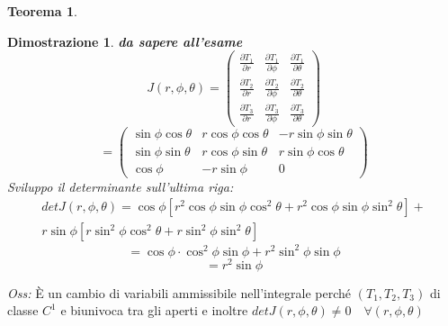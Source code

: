 \documentclass[10pt,landscape, a4paper]{article}
\newtheorem{teorema}{Teorema}
\newenvironment{thm}{\begin{mdframed}[backgroundcolor=white]\begin{teorema}}{\end{teorema}\end{mdframed}}
\newtheorem{demnstrn}{Dimostrazione}
\newenvironment{dimostrazione}{\begin{mdframed}[backgroundcolor=white]\begin{demnstrn}}{\end{demnstrn}\end{mdframed}}
\begin{document}
\begin{multicols}{3}
\begin{thm}
\end{thm}
\begin{dimostrazione} 
	\emph{\textbf{da sapere all'esame}}\\ %
	\begin{equation}
		J(r,\phi,\theta) = \begin{pmatrix}
			\frac{\partial T_1}{\partial r} & \frac{\partial T_1}{\partial \phi} & \frac{\partial T_1}{\partial \theta}\\
			\frac{\partial T_2}{\partial r} & \frac{\partial T_2}{\partial \phi} & \frac{\partial T_2}{\partial \theta}\\
			\frac{\partial T_3}{\partial r} & \frac{\partial T_3}{\partial \phi} & \frac{\partial T_3}{\partial \theta}
		\end{pmatrix}
	\end{equation}
	\begin{equation}
		= \begin{pmatrix}
			\sin\phi\cos\theta & r\cos\phi\cos\theta & -r\sin\phi\sin\theta\\
			\sin\phi\sin\theta & r\cos\phi\sin\theta & r\sin\phi\cos\theta\\
			\cos\phi & -r\sin\phi & 0
		\end{pmatrix}
	\end{equation}
	Sviluppo il determinante sull'ultima riga:
	\begin{multline} 
	   det J(r,\phi,\theta) = \cos\phi\left[r^2 \cos\phi\sin\phi\cos^2\theta   + r^2 \cos\phi\sin\phi\sin^2\theta\right] +   \\  r\sin\phi\left[r\sin^2\phi\cos^2\theta + r\sin^2\phi\sin^2\theta\right]
	\end{multline}
	\begin{equation}
		= \cos\phi \cdot \cos^2\phi\sin\phi+r^2\sin^2\phi\sin\phi
	\end{equation}
	\begin{equation}
		= r^2 \sin\phi
	\end{equation}
\end{dimostrazione}
\emph{Oss:} È un cambio di variabili ammissibile nell'integrale perché $(T_1,T_2,T_3)$ di classe $C^1$ e biunivoca tra gli aperti e inoltre $det J(r,\phi,\theta) \neq 0 \quad \forall (r,\phi,\theta)$



\end{multicols}
\end{document}
